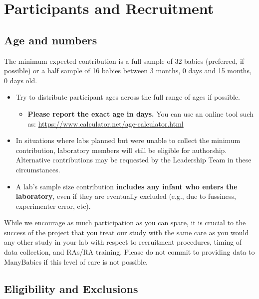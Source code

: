 \documentclass[
]{book}
\providecommand{\tightlist}{%
  \setlength{\itemsep}{0pt}\setlength{\parskip}{0pt}}
\begin{document}
\hypertarget{participants-and-recruitment}{%
\section{Participants and Recruitment}\label{participants-and-recruitment}}

\hypertarget{age-and-numbers}{%
\subsection{Age and numbers}\label{age-and-numbers}}

The minimum expected contribution is a full sample of 32 babies (preferred, if possible) or a half sample of 16 babies between 3 months, 0 days and 15 months, 0 days old.

\begin{itemize}
\tightlist
\item
  Try to distribute participant ages across the full range of ages if possible.

  \begin{itemize}
  \tightlist
  \item
    \textbf{Please report the exact age in days.} You can use an online tool such as: \url{https://www.calculator.net/age-calculator.html}
  \end{itemize}
\item
  In situations where labs planned but were unable to collect the minimum contribution, laboratory members will still be eligible for authorship. Alternative contributions may be requested by the Leadership Team in these circumstances.
\item
  A lab's sample size contribution \textbf{includes any infant who enters the laboratory}, even if they are eventually excluded (e.g., due to fussiness, experimenter error, etc).
\end{itemize}

While we encourage as much participation as you can spare, it is crucial to the success of the project that you treat our study with the same care as you would any other study in your lab with respect to recruitment procedures, timing of data collection, and RAs/RA training. Please do not commit to providing data to ManyBabies if this level of care is not possible.

\hypertarget{eligibility-and-exclusions}{%
\subsection{Eligibility and Exclusions}\label{eligibility-and-exclusions}}
\end{document}
